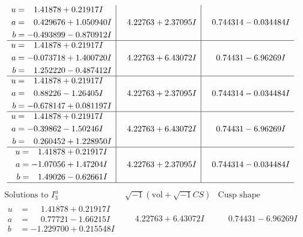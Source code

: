 \documentclass[1p]{elsarticle_modified}
\theoremstyle{definition}
\newcommand{\I}{\sqrt{-1}}
\begin{document}
$$\begin{array}{c|c|c}
\begin{aligned}
u &= \phantom{-}1.41878 + 0.21917 I \\
a &= \phantom{-}0.429676 + 1.050940 I \\
b &= -0.493899 - 0.870912 I\end{aligned}
 & \phantom{-}4.22763 + 2.37095 I & \phantom{-}0.744314 - 0.034484 I \\ \hline\begin{aligned}
u &= \phantom{-}1.41878 + 0.21917 I \\
a &= -0.073718 + 1.400720 I \\
b &= \phantom{-}1.252220 - 0.487412 I\end{aligned}
 & \phantom{-}4.22763 + 6.43072 I & \phantom{-}0.74431 - 6.96269 I \\ \hline\begin{aligned}
u &= \phantom{-}1.41878 + 0.21917 I \\
a &= \phantom{-}0.88226 - 1.26405 I \\
b &= -0.678147 + 0.081197 I\end{aligned}
 & \phantom{-}4.22763 + 2.37095 I & \phantom{-}0.744314 - 0.034484 I \\ \hline\begin{aligned}
u &= \phantom{-}1.41878 + 0.21917 I \\
a &= -0.39862 - 1.50246 I \\
b &= \phantom{-}0.260452 + 1.228950 I\end{aligned}
 & \phantom{-}4.22763 + 6.43072 I & \phantom{-}0.74431 - 6.96269 I \\ \hline\begin{aligned}
u &= \phantom{-}1.41878 + 0.21917 I \\
a &= -1.07056 + 1.47204 I \\
b &= \phantom{-}1.49026 - 0.62661 I\end{aligned}
 & \phantom{-}4.22763 + 2.37095 I & \phantom{-}0.744314 - 0.034484 I\\
 \hline 
 \end{array}$$\newpage$$\begin{array}{c|c|c}  
\text{Solutions to }I^u_{3}& \I (\text{vol} + \sqrt{-1}CS) & \text{Cusp shape}\\
 \hline 
\begin{aligned}
u &= \phantom{-}1.41878 + 0.21917 I \\
a &= \phantom{-}0.77721 - 1.66215 I \\
b &= -1.229700 + 0.215548 I\end{aligned}
 & \phantom{-}4.22763 + 6.43072 I & \phantom{-}0.74431 - 6.96269 I \\ \hline\begin{aligned}

\end{aligned}
\end{array}$$
\end{document}
